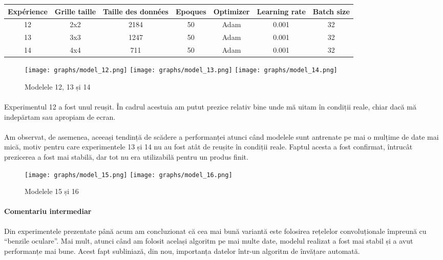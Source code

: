 \begin{center}
    \begin{tabular}{ c | c | c | c | c | c | c }
        \hline
        Expérience & Grille taille & Taille des données & Epoques & Optimizer & Learning rate & Batch size \\ 
        \hline
        12 & 2x2 & 2184 & 50 & Adam & 0.001 & 32 \\
        \hline
        13 & 3x3 & 1247 & 50 & Adam & 0.001 & 32 \\
        \hline
        14 & 4x4 & 711 & 50 & Adam & 0.001 & 32 \\
        \hline
    \end{tabular}
\end{center}

\begin{figure}
    \centering
    \texttt{[image: graphs/model\_12.png]}
    \texttt{[image: graphs/model\_13.png]}
    \texttt{[image: graphs/model\_14.png]}
    \caption{Modelele 12, 13 și 14}
\end{figure}

\paragraph{}
Experimentul 12 a fost unul reușit.
În cadrul acestuia am putut prezice relativ bine unde mă uitam în condiții reale, chiar dacă mă indepărtam sau apropiam de ecran.

\paragraph{}
Am observat, de asemenea, aceeași tendință de scădere a performanței atunci când modelele sunt antrenate pe mai o mulțime de date mai mică, motiv pentru care experimentele 13 și 14 nu au fost atât de reușite în condiții reale.
Faptul acesta a fost confirmat, întrucât prezicerea a fost mai stabilă, dar tot nu era utilizabilă pentru un produs finit.

\begin{figure}
    \centering
    \texttt{[image: graphs/model\_15.png]}
    \texttt{[image: graphs/model\_16.png]}
    \caption{Modelele 15 și 16}
\end{figure}

\paragraph{Comentariu intermediar}
Din experimentele prezentate până acum am concluzionat că cea mai bună variantă este folosirea rețelelor convoluționale împreună cu ``benzile oculare''.
Mai mult, atunci când am folosit același algoritm pe mai multe date, modelul realizat a fost mai stabil și a avut performanțe mai bune.
Acest fapt subliniază, din nou, importanța datelor într-un algoritm de învățare automată.

